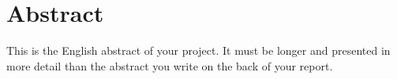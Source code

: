 \chapter*{Abstract}

This is the English abstract of your project. It must be longer and presented
in more detail than the abstract you write on the back of your report.
